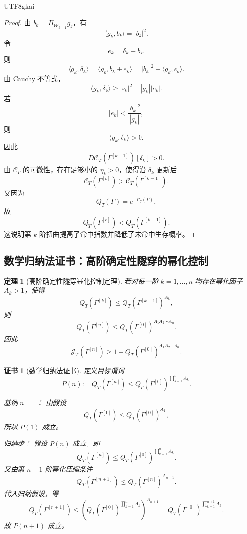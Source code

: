 \documentclass[12pt]{article}
\newtheorem{theorem}{定理}[section]
\newtheorem{Certificate}{证书}[section]
\begin{document}
\begin{CJK*}{UTF8}{gkai}
\begin{proof}
由 \(b_k=\Pi_{\mathcal W_{k-1}^{\perp}}g_k\)，有
\[
  \langle g_k,b_k\rangle=|b_k|^2.
\]
令
\[
  e_k=\delta_k-b_k.
\]
则
\[
  \langle g_k,\delta_k\rangle
  =
  \langle g_k,b_k+e_k\rangle
  =
  |b_k|^2+\langle g_k,e_k\rangle.
\]
由 Cauchy 不等式，
\[
  \langle g_k,\delta_k\rangle
  \ge
  |b_k|^2-|g_k||e_k|.
\]
若
\[
  |e_k|<
  \frac{|b_k|^2}{|g_k|},
\]
则
\[
  \langle g_k,\delta_k\rangle>0.
\]
因此
\[
  D\mathcal C_T(\Gamma^{[k-1]})[\delta_k]>0.
\]
由 \(\mathcal C_T\) 的可微性，存在足够小的 \(\eta_k>0\)，使得沿 \(\delta_k\) 更新后
\[
  \mathcal C_T(\Gamma^{[k]})
  >
  \mathcal C_T(\Gamma^{[k-1]}).
\]
又因为
\[
  Q_T(\Gamma)=e^{-\mathcal C_T(\Gamma)},
\]
故
\[
  Q_T(\Gamma^{[k]})
  <
  Q_T(\Gamma^{[k-1]}).
\]
这说明第 \(k\) 阶扭曲提高了命中指数并降低了未命中生存概率。
\end{proof}

\subsection{数学归纳法证书：高阶确定性隧穿的幂化控制}
\label{subsec:tex55-deterministic-tunnel-induction}

\begin{theorem}[高阶确定性隧穿幂化控制定理]
\label{thm:tex55-deterministic-tunnel-power-control}
若对每一阶 \(k=1,\ldots,n\) 均存在幂化因子 \(A_k>1\)，使得
\[
  Q_T(\Gamma^{[k]})
  \le
  Q_T(\Gamma^{[k-1]})^{A_k},
\]
则
\[
  \boxed{
  Q_T(\Gamma^{[n]})
  \le
  Q_T(\Gamma^{[0]})^{A_1A_2\cdots A_n}.
  }
\]
因此
\[
  \boxed{
  \mathcal J_T(\Gamma^{[n]})
  \ge
  1-
  Q_T(\Gamma^{[0]})^{A_1A_2\cdots A_n}.
  }
\]
\end{theorem}

\begin{Certificate}[数学归纳法证书]
\label{cert:tex55-deterministic-tunnel-power-control}
定义目标谓词
\[
  P(n):
  \quad
  Q_T(\Gamma^{[n]})
  \le
  Q_T(\Gamma^{[0]})^{\prod_{k=1}^{n}A_k}.
\]

基例 \(n=1\)：
由假设
\[
  Q_T(\Gamma^{[1]})
  \le
  Q_T(\Gamma^{[0]})^{A_1},
\]
所以 \(P(1)\) 成立。

归纳步：
假设 \(P(n)\) 成立，即
\[
  Q_T(\Gamma^{[n]})
  \le
  Q_T(\Gamma^{[0]})^{\prod_{k=1}^{n}A_k}.
\]
又由第 \(n+1\) 阶幂化压缩条件
\[
  Q_T(\Gamma^{[n+1]})
  \le
  Q_T(\Gamma^{[n]})^{A_{n+1}}.
\]
代入归纳假设，得
\[
  Q_T(\Gamma^{[n+1]})
  \le
  \left(
  Q_T(\Gamma^{[0]})^{\prod_{k=1}^{n}A_k}
  \right)^{A_{n+1}}
  =
  Q_T(\Gamma^{[0]})^{\prod_{k=1}^{n+1}A_k}.
\]
故 \(P(n+1)\) 成立。


\end{Certificate}
\end{CJK*}
\end{document}
